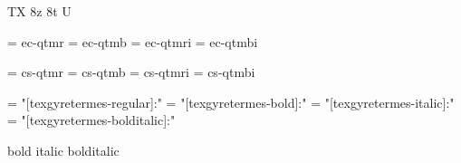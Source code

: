 
\ifx\ffdecl\undefined  \fi

\ffdecl [TG Termes] {\rm \bf \it \bi} {\caps} {} {TX} {8z 8t U}

\def\caps{\ffsetV{caps}{-sc}\ffsetX}  \def\nocaps{\ffsetV{caps}{}\ffsetX}
\def\capsV{} 

\ismacro{}\ifttrue

   \font\tenrm = ec-qtmr  \sizespec
   \font\tenbf = ec-qtmb  \sizespec
   \font\tenit = ec-qtmri \sizespec
   \font\tenbi = ec-qtmbi \sizespec

   \def\ffnamegen{ec-qtm\ffvarV\capsV}

\fi

\ismacro{}\iftrue

   \font\tenrm = cs-qtmr  \sizespec
   \font\tenbf = cs-qtmb  \sizespec
   \font\tenit = cs-qtmri \sizespec
   \font\tenbi = cs-qtmbi \sizespec

   \def\ffnamegen{cs-qtm\ffvarV\capsV}
   

\fi

\ismacro{}\iftrue

   \font\tenrm = "[texgyretermes-regular]:\fontfeatures"    \sizespec
   \font\tenbf = "[texgyretermes-bold]:\fontfeatures"       \sizespec
   \font\tenit = "[texgyretermes-italic]:\fontfeatures"     \sizespec
   \font\tenbi = "[texgyretermes-bolditalic]:\fontfeatures" \sizespec

   \def\ffnamegen{"[texgyretermes-\ffvarV]:\capsV\fontfeatures"} 

    {bold} {italic} {bolditalic}
   \def\caps{\ffsetV{caps}{+smcp;}\ffsetX}

\fi
\tenrm %

\ifx\loadmathfonts\relax \endinput \fi
\ifx\mathpreloaded X\else  \fi                     

\endinput

